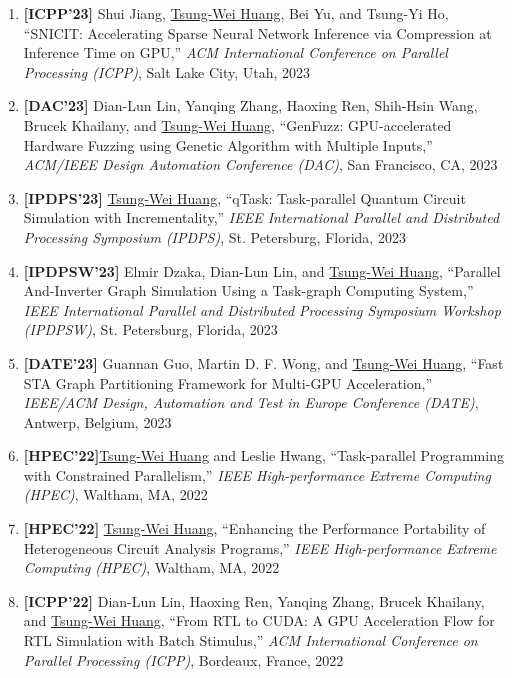 \documentclass[A4,11pt]{article}
\begin{document}
\begin{enumerate}
    \item \textbf{[ICPP'23]} Shui Jiang, \underline{Tsung-Wei Huang}, Bei Yu, and Tsung-Yi Ho, ``SNICIT: Accelerating Sparse Neural Network Inference via Compression at Inference Time on GPU,'' \textit{ACM International Conference on Parallel Processing (ICPP)}, Salt Lake City, Utah, 2023

    \item \textbf{[DAC'23]} Dian-Lun Lin, Yanqing Zhang, Haoxing Ren, Shih-Hsin Wang, Brucek Khailany, and \underline{Tsung-Wei Huang}, ``GenFuzz: GPU-accelerated Hardware Fuzzing using Genetic Algorithm with Multiple Inputs,'' \textit{ACM/IEEE Design Automation Conference (DAC)}, San Francisco, CA, 2023

    \item \textbf{[IPDPS'23]} \underline{Tsung-Wei Huang}, ``qTask: Task-parallel Quantum Circuit Simulation with Incrementality,'' \textit{IEEE International Parallel and Distributed Processing Symposium (IPDPS)}, St. Petersburg, Florida, 2023 

    \item \textbf{[IPDPSW'23]} Elmir Dzaka, Dian-Lun Lin, and \underline{Tsung-Wei Huang}, ``Parallel And-Inverter Graph Simulation Using a Task-graph Computing System,'' \textit{IEEE International Parallel and Distributed Processing Symposium Workshop (IPDPSW)}, St. Petersburg, Florida, 2023 

    \item \textbf{[DATE'23]} Guannan Guo, Martin D. F. Wong, and \underline{Tsung-Wei Huang}, ``Fast STA Graph Partitioning Framework for Multi-GPU Acceleration,'' \textit{IEEE/ACM Design, Automation and Test in Europe Conference (DATE)}, Antwerp, Belgium, 2023
    \item \textbf{[HPEC'22]}\underline{Tsung-Wei Huang} and Leslie Hwang, ``Task-parallel Programming with Constrained Parallelism,'' \textit{IEEE High-performance Extreme Computing (HPEC)}, Waltham, MA, 2022

    \item \textbf{[HPEC'22]} \underline{Tsung-Wei Huang}, ``Enhancing the Performance Portability of Heterogeneous Circuit Analysis Programs,'' \textit{IEEE High-performance Extreme Computing (HPEC)}, Waltham, MA, 2022

    \item \textbf{[ICPP'22]} Dian-Lun Lin, Haoxing Ren, Yanqing Zhang, Brucek Khailany, and \underline{Tsung-Wei Huang}, ``From RTL to CUDA: A GPU Acceleration Flow for RTL Simulation with Batch Stimulus,'' \textit{ACM International Conference on Parallel Processing (ICPP)}, Bordeaux, France, 2022


\end{enumerate}
\end{document}
